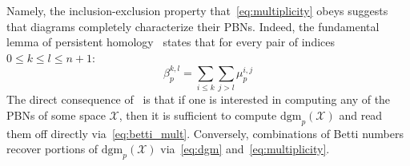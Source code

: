 Namely, the inclusion-exclusion property that~\eqref{eq:multiplicity} obeys suggests that diagrams completely characterize their PBNs.
Indeed, the fundamental lemma of persistent homology~\cite{edelsbrunner2022computational} states that for every pair of indices $0 \leq k \leq l \leq n+1$: 
\begin{equation}\label{eq:betti_mult}
	\beta_p^{k,l} = \sum\limits_{i \leq k} \sum\limits_{j > l} \mu_p^{i,j}
\end{equation}
The direct consequence of~\cite{edelsbrunner2022computational} is that if one is interested in computing any of the PBNs of some space $\mathcal{X}$, then it is sufficient to compute $\mathrm{dgm}_p(\mathcal{X})$ and read them off directly via~\eqref{eq:betti_mult}. Conversely, combinations of Betti numbers recover portions of $\mathrm{dgm}_p(\mathcal{X})$  via~\eqref{eq:dgm} and~\eqref{eq:multiplicity}.



